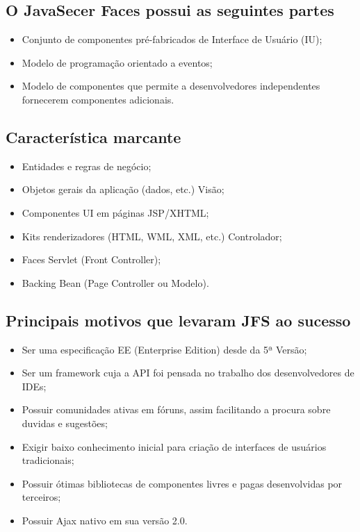 \documentclass[12pt,a4paper]{article}
\begin{document}
\subsection{O JavaSecer Faces possui as seguintes partes}
\begin{itemize}
\item Conjunto de componentes pré-fabricados de Interface de Usuário (IU);

\item Modelo de programação orientado a eventos;

\item Modelo de componentes que permite a desenvolvedores independentes fornecerem componentes adicionais.
\end{itemize}

\subsection{Característica marcante}
\begin{itemize}
\item Entidades e regras de negócio;

\item Objetos gerais da aplicação (dados, etc.)
Visão;

\item Componentes UI em páginas JSP/XHTML;

\item Kits renderizadores (HTML, WML, XML, etc.)
Controlador;

\item Faces Servlet (Front Controller);

\item Backing Bean (Page Controller ou Modelo).
\end{itemize}

\subsection{Principais motivos que levaram JFS ao sucesso}
\begin{itemize}
\item Ser uma especificação EE (Enterprise Edition)  desde da 5ª Versão;

\item Ser um framework cuja a API foi pensada no trabalho dos desenvolvedores de IDEs;

\item Possuir comunidades ativas em fóruns, assim facilitando a procura sobre duvidas e sugestões;

\item Exigir baixo conhecimento inicial para criação de interfaces de usuários tradicionais;

\item Possuir ótimas bibliotecas de componentes livres e pagas desenvolvidas por terceiros;

\item Possuir Ajax nativo em sua versão 2.0.
\end{itemize}
\end{document}
